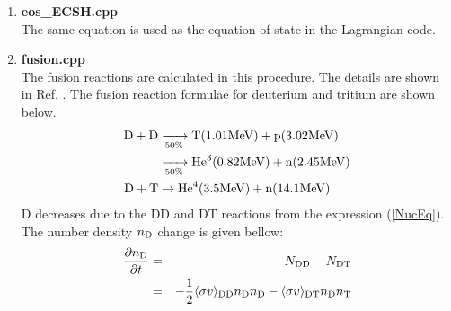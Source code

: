 \begin{enumerate}
\item{\bf eos\_ECSH.cpp}\\
The same equation is used as the equation of state in the Lagrangian code.
\item{\bf fusion.cpp}\\
The fusion reactions are calculated in this procedure. The details are shown in Ref. \cite{CPC-O-SUKI}. The fusion reaction formulae for deuterium and tritium are shown below.
	\begin{eqnarray}
	\begin{split}
		\rm D+\rm D&\xrightarrow[50\%]{}\rm T(1.01{\rm MeV})+\rm p(3.02{\rm MeV})\\
		&\xrightarrow[50\%]{}{\rm He}^3(0.82{\rm MeV})+\rm n(2.45{\rm MeV})\\
		\rm D+\rm T&\rightarrow{\rm He}^4(3.5{\rm MeV})+\rm n(14.1{\rm MeV})
		\end{split}
		\label{NucEq}
	\end{eqnarray}
	D decreases due to the DD and DT reactions from the expression (\ref {NucEq}). The number density $n_{\rm D} $ change  is given bellow: 	
	\begin{eqnarray}
	\label{eq:ReacD}
		\frac{\partial n_{\rm D}}{\partial t}&=&-N_{\rm DD}-N_{\rm DT}\nonumber\\
							 &=&-\frac{1}{2}\langle\sigma v\rangle_{\rm DD}n_{\rm D}n_{\rm D}-\langle\sigma v\rangle_{\rm DT}n_{\rm D}n_{\rm T}
	\end{eqnarray}


\end{enumerate}
